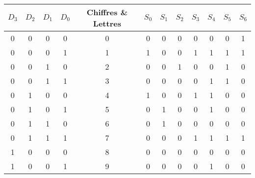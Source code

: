 \documentclass[12pt]{article}
\begin{document}
\singlespacing
\begin{center}
	\begin{tabular}{|c|c|c|c|c|c|c|c|c|c|c|c|}
		\hline
		\textbf{$D_3$} & \textbf{$D_2$} & $D_1$ & $D_0$ & Chiffres \& Lettres & \textbf{$S_0$} & \textbf{$S_1$} & \textbf{$S_2$} & $S_3$ & $S_4$ & \textbf{$S_5$} & \textbf{$S_6$} \\ \hline
		0              & 0              & 0     & 0     & 0                   & 0              & 0              & 0              & 0     & 0     & 0              & 1              \\ \hline
		0              & 0              & 0     & 1     & 1                   & 1              & 0              & 0              & 1     & 1     & 1              & 1              \\ \hline
		0              & 0              & 1     & 0     & 2                   & 0              & 0              & 1              & 0     & 0     & 1              & 0              \\ \hline
		0              & 0              & 1     & 1     & 3                   & 0              & 0              & 0              & 0     & 1     & 1              & 0              \\ \hline
		0              & 1              & 0     & 0     & 4                   & 1              & 0              & 0              & 1     & 1     & 0              & 0              \\ \hline
		0              & 1              & 0     & 1     & 5                   & 0              & 1              & 0              & 0     & 1     & 0              & 0              \\ \hline
		0              & 1              & 1     & 0     & 6                   & 0              & 1              & 0              & 0     & 0     & 0              & 0              \\ \hline
		0              & 1              & 1     & 1     & 7                   & 0              & 0              & 0              & 1     & 1     & 1              & 1              \\ \hline
		1              & 0              & 0     & 0     & 8                   & 0              & 0              & 0              & 0     & 0     & 0              & 0              \\ \hline
		1              & 0              & 0     & 1     & 9                   & 0              & 0              & 0              & 0     & 1     & 0              & 0              \\ \hline

\end{tabular}
\end{center}
\end{document}
